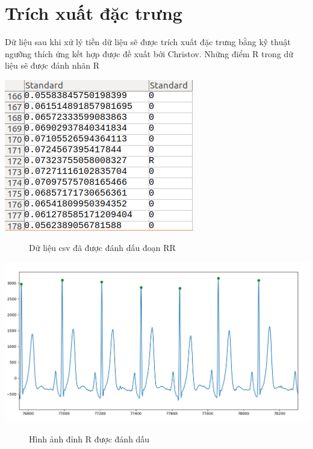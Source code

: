 \section{Trích xuất đặc trưng}
Dữ liệu sau khi xử lý tiền dữ liệu sẽ được trích xuất đặc trưng bằng kỹ thuật ngưỡng thích ứng kết hợp được đề xuất bới Christov. Những điểm R trong dữ liệu sẽ được đánh nhãn R
\begin{center}
    \includegraphics[scale=.5]{image/model/fx_rr.png}
    \begin{figure}[htp]
    \begin{center}
    \end{center}
    \caption{Dữ liệu csv đã được đánh dấu đoạn RR}
    \end{figure}
\end{center}
\begin{center}
    \includegraphics[scale=.4]{image/chapter5/R_detect.png}
    \begin{figure}[htp]
    \begin{center}
    \end{center}
    \caption{Hình ảnh đỉnh R được đánh dấu}
    \end{figure}
\end{center}

